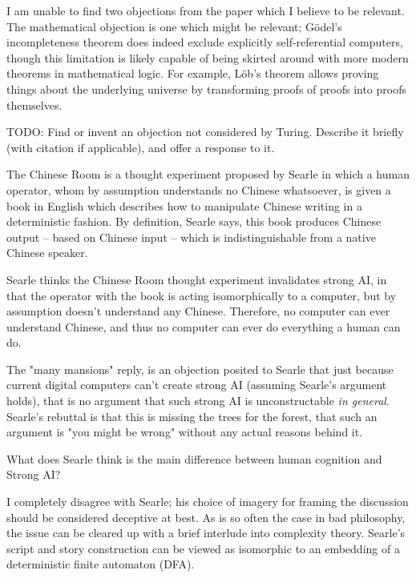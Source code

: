 \documentclass[12pt]{article}
\begin{document}
\problemsub
I am unable to find two objections from the paper which I believe to be relevant. The mathematical objection is one
which might be relevant; G\"odel's incompleteness theorem does indeed exclude explicitly self-referential computers,
though this limitation is likely capable of being skirted around with more modern theorems in mathematical logic. For
example, L\"ob's theorem allows proving things about the underlying universe by transforming proofs of proofs into
proofs themselves.

\problemsub
TODO: Find or invent an objection not considered by Turing. Describe
it briefly (with citation if applicable), and offer a response to it.


\problemsub
The Chinese Room is a thought experiment proposed by Searle in which a human operator, whom by assumption understands no
Chinese whatsoever, is given a book in English which describes how to manipulate Chinese writing in a deterministic
fashion. By definition, Searle says, this book produces Chinese output -- based on Chinese input -- which is
indistinguishable from a native Chinese speaker.

\problemsub
Searle thinks the Chinese Room thought experiment invalidates strong AI, in that the operator with the book is acting
isomorphically to a computer, but by assumption doesn't understand any Chinese. Therefore, no computer can ever
understand Chinese, and thus no computer can ever do everything a human can do.

\problemsub
The "many mansions" reply, is an objection posited to Searle that just because current digital computers can't create
strong AI (assuming Searle's argument holds), that is no argument that such strong AI is unconstructable \textit{in
general}. Searle's rebuttal is that this is missing the trees for the forest, that such an argument is "you might be
wrong" without any actual reasons behind it.


\problemsub
What does Searle think is the main difference between human
cognition and Strong AI?

\problemsub
I completely disagree with Searle; his choice of imagery for framing the discussion should be considered deceptive at
best. As is so often the case in bad philosophy, the issue can be cleared up with a brief interlude into complexity
theory. Searle's script and story construction can be viewed as isomorphic to an embedding of a deterministic finite
automaton (DFA).
\end{document}

